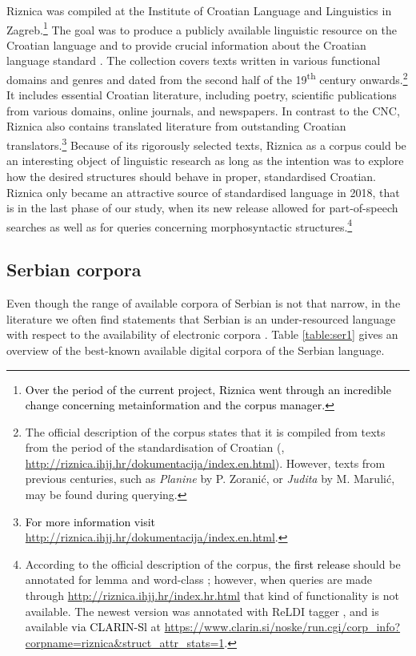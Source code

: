 Riznica was compiled at the Institute of Croatian Language and Linguistics in Zagreb.\footnote{\textcolor{black}{Over the period of the current project, Riznica went through an incredible change concerning metainformation and the corpus manager.}} The goal was to produce a publicly available linguistic resource on the Croatian language and to provide crucial information about the Croatian language standard \citep[51]{CavarBrozovic12}. The collection covers texts written in various functional domains and genres and dated from the second half of the 19\textsuperscript{th} century onwards.\footnote{The official description of the corpus states that it is compiled from texts from the period of the standardisation of Croatian (\citealt[52]{CavarBrozovic12}, \url{http://riznica.ihjj.hr/dokumentacija/index.en.html}). However, texts from previous centuries, such as \textit{Planine} by P. Zoranić, or \textit{Judita} by M. Marulić, may be found during querying.} It includes essential Croatian literature, including poetry, scientific publications from various domains, online journals, and newspapers. In contrast to the CNC, Riznica also contains translated literature from outstanding Croatian translators.\footnote{\textcolor{black}{For more information visit} \url{http://riznica.ihjj.hr/dokumentacija/index.en.html}.} Because of its rigorously selected texts, Riznica as a corpus could be an interesting object of linguistic research as long as the intention was to explore how the desired structures should behave in proper, standardised Croatian. Riznica only became an attractive source of standardised language in 2018, that is in the last phase of our study, when its new release allowed for part-of-speech searches as well as for queries concerning morphosyntactic structures.\footnote{According to the official description of the corpus, \textcolor{black}{the first release} should be annotated for lemma and word-class \citep[52]{CavarBrozovic12}; however, when queries are made through \url{http://riznica.ihjj.hr/index.hr.html} that kind of functionality is not available. The newest version was annotated with ReLDI tagger \citep{LjubesicErjavec16}, and is available \textcolor{black}{via CLARIN-Sl} at \url{https://www.clarin.si/noske/run.cgi/corp\_info?corpname=riznica\&struct\_attr\_stats=1}.}

\subsection{Serbian corpora}

Even though the range of available corpora of Serbian is not that narrow, in the literature we often find statements that Serbian is an under-resourced language with respect to the availability of electronic corpora \parencites[685]{Dobric12}[4106]{BSM14}. Table \ref{table:ser1} gives an overview of the best-known available digital corpora of the Serbian language. 

